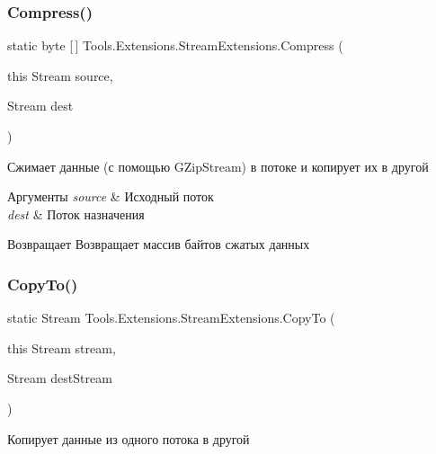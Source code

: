 \subsubsection{\texorpdfstring{Compress()}{Compress()}}
{\footnotesize\ttfamily static byte \mbox{[}$\,$\mbox{]} Tools.\+Extensions.\+Stream\+Extensions.\+Compress (\begin{DoxyParamCaption}\item[{this Stream}]{source,  }\item[{Stream}]{dest }\end{DoxyParamCaption})\hspace{0.3cm}{\ttfamily [static]}}



Сжимает данные (с помощью G\+Zip\+Stream) в потоке и копирует их в другой 


\begin{DoxyParams}{Аргументы}
{\em source} & Исходный поток\\
\hline
{\em dest} & Поток назначения\\
\hline
\end{DoxyParams}
\begin{DoxyReturn}{Возвращает}
Возвращает массив байтов сжатых данных
\end{DoxyReturn}
\mbox{\label{class_tools_1_1_extensions_1_1_stream_extensions_ac7d5c6e9c74cb80aa5645882984d9497}} 
\subsubsection{\texorpdfstring{Copy\+To()}{CopyTo()}}
{\footnotesize\ttfamily static Stream Tools.\+Extensions.\+Stream\+Extensions.\+Copy\+To (\begin{DoxyParamCaption}\item[{this Stream}]{stream,  }\item[{Stream}]{dest\+Stream }\end{DoxyParamCaption})\hspace{0.3cm}{\ttfamily [static]}}



Копирует данные из одного потока в другой 


